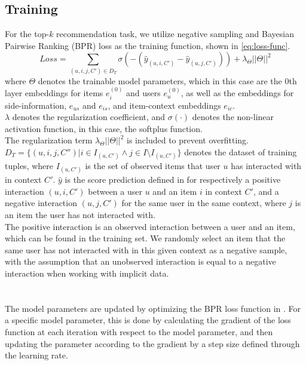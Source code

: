 \subsection{Training}\label{subsec:csgcn_is_training}
For the top-$k$ recommendation task, we utilize negative sampling and Bayesian Pairwise Ranking (BPR) loss \cite{BPR} as the training function, shown in \autoref{eq:loss-func}.
\begin{equation}\label{eq:loss-func}
    Loss = \sum_{(u,i,j,C') \in D_T} \sigma(-(\hat{y}_{(u,i,C')} - \hat{y}_{(u,j,C')})) + \lambda_\Theta ||\Theta||^2
\end{equation}
where $\Theta$ denotes the trainable model parameters, which in this case are the 0th layer embeddings for items $e_{i}^{(0)}$ and users $e_{u}^{(0)}$, as well as the embeddings for side-information, $e_{us}$ and $e_{is}$, and item-context embeddings $e_{ic}$.\\
$\lambda$ denotes the regularization coefficient, and $\sigma(\cdot)$ denotes the non-linear activation function, in this case, the softplus function.\\
The regularization term $\lambda_\Theta ||\Theta||^2$ is included to prevent overfitting.\\
$D_T = \{(u,i,j,C'') | i \in I_{(u,C')} \wedge  j \in I \setminus I_{(u,C')}\}$ denotes the dataset of training tuples, where $I_{(u,C')}$ is the set of observed items that user $u$ has interacted with in context $C'$.
$\hat{y}$ is the score prediction defined in  for respectively a positive interaction $(u,i,C')$ between a user $u$ and an item $i$ in context $C'$, and a negative interaction $(u,j,C')$ for the same user in the same context, where $j$ is an item the user has not interacted with.\\
The positive interaction is an observed interaction between a user and an item, which can be found in the training set.
We randomly select an item that the same user has not interacted with in this given context as a negative sample, with the assumption that an unobserved interaction is equal to a negative interaction when working with implicit data.\\
\\\\
The model parameters are updated by optimizing the BPR loss function in .
For a specific model parameter, this is done by calculating the gradient of the loss function at each iteration with respect to the model parameter, and then updating the parameter according to the gradient by a step size defined through the learning rate.
